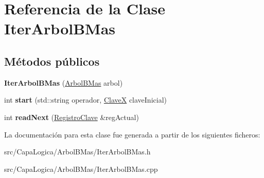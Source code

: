 \hypertarget{class_iter_arbol_b_mas}{\section{\-Referencia de la \-Clase \-Iter\-Arbol\-B\-Mas}
\label{class_iter_arbol_b_mas}
}
\subsection*{\-Métodos públicos}
\begin{DoxyCompactItemize}
\item 
\hypertarget{class_iter_arbol_b_mas_a83110ab08733e39e4a3f97f9cb09e330}{{\bfseries \-Iter\-Arbol\-B\-Mas} (\hyperlink{class_arbol_b_mas}{\-Arbol\-B\-Mas} arbol)}\label{class_iter_arbol_b_mas_a83110ab08733e39e4a3f97f9cb09e330}

\item 
\hypertarget{class_iter_arbol_b_mas_a8a8166de6a61d1be8658799951f994de}{int {\bfseries start} (std\-::string operador, \hyperlink{class_clave_x}{\-Clave\-X} clave\-Inicial)}\label{class_iter_arbol_b_mas_a8a8166de6a61d1be8658799951f994de}

\item 
\hypertarget{class_iter_arbol_b_mas_a0fc2b8481ff57c4f718dac6242a04cdd}{int {\bfseries read\-Next} (\hyperlink{class_registro_clave}{\-Registro\-Clave} \&reg\-Actual)}\label{class_iter_arbol_b_mas_a0fc2b8481ff57c4f718dac6242a04cdd}

\end{DoxyCompactItemize}


\-La documentación para esta clase fue generada a partir de los siguientes ficheros\-:\begin{DoxyCompactItemize}
\item 
src/\-Capa\-Logica/\-Arbol\-B\-Mas/\-Iter\-Arbol\-B\-Mas.\-h\item 
src/\-Capa\-Logica/\-Arbol\-B\-Mas/\-Iter\-Arbol\-B\-Mas.\-cpp\end{DoxyCompactItemize}
